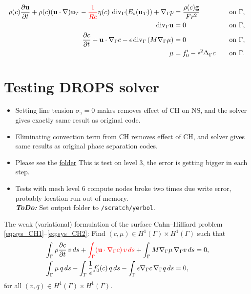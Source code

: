 \documentclass{article}
\newcommand{\vect}[1]{\boldsymbol{\mathbf{#1}}}
\newcommand{\bu}{\mathbf u}
\newcommand{\divG}{{\mathop{\,\rm div}}_{\Gamma}}
\newcommand{\gradG}{\nabla_{\Gamma}}
\newcommand{\nablaG}{\nabla_{\Gamma}}
\newcommand{\laplG}{\Delta_{\Gamma}}
\begin{document}
\begin{align}
\rho(c) \frac{\partial\vect u}{\partial t} + \rho(c)(\vect u\cdot\nabla)\vect u_T - {\color{red}\frac{1}{Re}}\eta(c)\,\divG(E_s(\vect u_T)) + \nabla_\Gamma p &=  \frac{\rho(c)\textbf{g}}{Fr^2} \quad &\text{on}~\Gamma,   \\
\divG \bu & =0 \quad &\text{on}~\Gamma, \\
\frac{\partial c}{\partial t} +\bu\cdot\nablaG c-  \epsilon \divG \left(M \gradG \mu \right)  &= 0 \quad &\text{on}~\Gamma , \\
\mu &= f_0' - \epsilon^2 \laplG c \quad &\text{on}~\Gamma. 
\end{align}

\section{Testing DROPS solver}
\begin{itemize}
	
	
	\item Setting line tension $\sigma_\gamma=0$ makes removes effect of CH on NS, and the solver gives exactly same result as original code.
	
	\item Eliminating convection term from CH removes effect of CH, and solver gives same results as original phase separation codes.
	
	\item Please see the \href{https://www.dropbox.com/sh/bun3sdmbkw9bgax/AAD5kkeIuiPMgwdWsmpdHpFFa?dl=0}{folder} This is test on level 3, the error is getting bigger in each step.
	
	\item Tests with mesh level 6 compute nodes broke two times due write error, probably location run out of memory.\\ \textbf{\textit{ToDo:}} Set output folder to \verb|/scratch/yerbol|. 
\end{itemize}
\newpage

The weak (variational) formulation of the surface Cahn--Hilliard problem \eqref{eq:sys_CH1}--\eqref{eq:sys_CH2}: Find $(c,\mu) \in H^1(\Gamma) \times H^1(\Gamma)$ %
such that
\begin{align}
&\int_\Gamma \rho \frac{\partial c}{\partial t} \,v \, ds +{\color{red} \int_\Gamma (\bu\cdot\nablaG c)\, v\, ds} + \int_\Gamma M \gradG \mu \, \gradG v \, ds = 0, \label{eq:sys_CH1_weak} \\
&\int_\Gamma  \mu \,q \, ds - \int_\Gamma \frac{1}{\epsilon}f_0'(c) \,q \, ds - \int_\Gamma \epsilon \gradG c \, \gradG q \, ds = 0, \label{eq:sys_CH2_weak}
\end{align}
for all $ (v,q) \in H^1(\Gamma) \times H^1(\Gamma)$.
\end{document}
